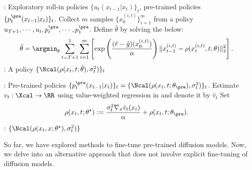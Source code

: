 \begin{algorithm}[!t]
\caption{(Monte Carlo) Value weighed regression}\label{alg:weightedMLE}
\begin{algorithmic}[1]
     :  Exploratory roll-in policies $\{u_{t}(x_{t-1}|x_t)\}_t$, pre-trained policies $\{p^{\pre}_{t}(x_{t-1}|x_t)\}_t$. 
      \STATE Collect $m$ samples $\{x^{(i,t)}_0\}_{i=1}^m$ from a policy $u_{T+1},\cdots,u_{t},p^{\pre}_{t},\cdots,p^{\pre}_{1} $.  
     \ENDFOR
      \STATE Define $\hat \theta$ by solving the below:  
      \begin{align}\label{eq:key}
 \hat \theta = \argmin_{\theta}\sum_{t=T+1}^1 \sum_{i=1}^m  \left[\exp \left (\frac{(\hat r-\hat g)(x^{(i,t)}_0)}{\alpha} \right)\|x^{(i,t)}_{t-1} -\rho(x^{(i,t)}_t,t;\theta) \|^2_2   \right]. 
      \end{align}  
  : A policy $\{\Ncal(\rho(x_t,t;\hat \theta),\sigma^2_t )  \}_t$ 
\end{algorithmic}
\end{algorithm}

\begin{algorithm}[!t]
\caption{Value weighted sampling}\label{alg:value_sampling}
\begin{algorithmic}[1]

 :  Pre-trained policies $\{p^{\pre}_{t}(x_{t-1}|x_t)\}_t = \{ \Ncal(\rho(x_t,t; \theta_{\pre}),\sigma^2_t)\}_t $. 
      \STATE Estimate $v_t:\Xcal \to \RR$ using value-weighted regression in   and denote it by $\hat v_t$ 
      \STATE Set 
     \begin{align*}
        \rho(x_t,t; \theta^{\star}):= \frac{\sigma^2_t \nabla_x \hat v_t(x_t)}{\alpha}  + \rho(x_t,t; \theta_{\pre}). 
\end{align*}
\ENDFOR 
  : $\{\Ncal(\rho(x_t,x; \theta^{\star}),\sigma^2_t)\}$
\end{algorithmic}
\end{algorithm}

So far, we have explored methods to fine-tune pre-trained diffusion models. Now, we delve into an alternative approach that does not involve explicit fine-tuning of diffusion models.

